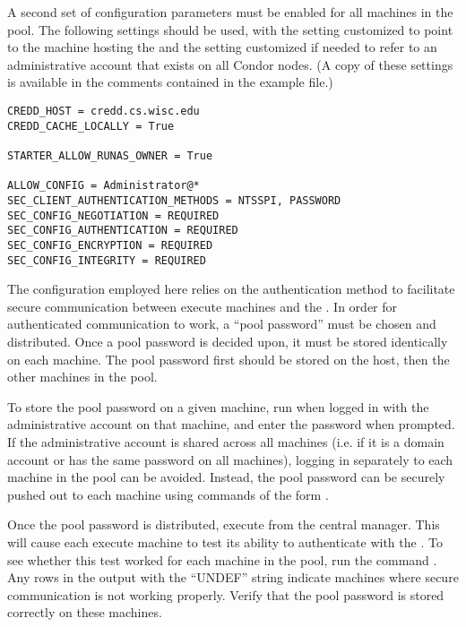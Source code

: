A second set of configuration parameters must be enabled for all
machines in the pool. The following settings should be used, with
the  setting customized to point to the machine
hosting the  and the  setting
customized if needed to refer to an administrative account that exists
on all Condor nodes. (A copy of these settings is available in the
comments contained in the
 example file.)
\begin{verbatim}
CREDD_HOST = credd.cs.wisc.edu
CREDD_CACHE_LOCALLY = True

STARTER_ALLOW_RUNAS_OWNER = True

ALLOW_CONFIG = Administrator@*
SEC_CLIENT_AUTHENTICATION_METHODS = NTSSPI, PASSWORD
SEC_CONFIG_NEGOTIATION = REQUIRED
SEC_CONFIG_AUTHENTICATION = REQUIRED
SEC_CONFIG_ENCRYPTION = REQUIRED
SEC_CONFIG_INTEGRITY = REQUIRED
\end{verbatim}

The configuration employed here relies on the \verb@PASSWORD@
authentication method to facilitate secure communication between execute
machines and the . In order for \verb@PASSWORD@ 
authenticated communication to work, a ``pool password'' must be chosen
and distributed. Once a pool password is decided upon, it must be
stored identically on each machine. The pool password first should be
stored on the  host, then the other machines in the pool.

To store the pool password on a given machine, run
 when logged in with the administrative
account on that machine, and enter the password when prompted. If
the administrative account is shared across all machines (i.e. if it
is a domain account or has the same password on all machines),
logging in separately to each machine in the pool can be avoided.
Instead, the pool password can be securely pushed out to each machine
using commands of the form
.

Once the pool password is distributed, execute
 from the central manager. This will cause
each execute machine to test its ability to authenticate with the
. To see whether this test worked for each machine in the
pool, run the command
.
Any rows in the output with the ``UNDEF'' string indicate machines where
secure communication is not working properly. Verify that the pool password
is stored correctly on these machines.

